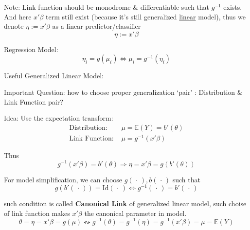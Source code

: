    Note: Link function should be monodrome \& differentiable such that $ g^{-1} $ exists. And here $ x'\beta  $ term still exist (because it's still generalized \uline{linear} model), thus we denote $ \eta:=x'\beta  $ as a linear predictor/classifier
    \begin{equation}
        \eta:= x'\beta  
    \end{equation}
    
    Regression Model:
    \begin{equation}
        \eta_i=g(\mu_i)\Leftrightarrow \mu _i=g^{-1}(\eta_i) 
    \end{equation}

\begin{point}
    Useful Generalized Linear Model:
\end{point}

    Important Question: how to choose proper generalization `pair' : Distribution \& Link Function pair?

    Idea: Use the expectation transform:
\begin{align}
    \text{Distribution: }&\mu =\mathbb{E}(Y)=b'(\theta )\\
    \text{Link Function: }& \mu=g^{-1}(x'\beta ) 
\end{align}
    
    Thus 
    \begin{equation}
        g^{-1}(x'\beta )=b'(\theta )\Rightarrow  \eta=x'\beta = g(b'(\theta ))
    \end{equation}
    
    For model simplification, we can choose $ g(\,\cdot\,), b(\,\cdot\,) $ such that 
\begin{equation}\label{EqaGLMModelFunctionSelection}
    g(b'(\,\cdot\,))=\mathrm{Id}(\,\cdot\,)\Leftrightarrow g^{-1}(\,\cdot\,)=b'(\,\cdot\,)    
\end{equation}

    such condition is called \textbf{Canonical Link} of generalized linear model, such choise of link function makes $ x'\beta  $ the canonical parameter in model.
    \begin{equation}
        \theta=\eta=x'\beta =g(\mu )\leftrightsquigarrow g^{-1}(\theta )=g^{-1}(\eta)=g^{-1}(x'\beta )=\mu =\mathbb{E}(Y)
    \end{equation}
    
    
    
    
    
    


